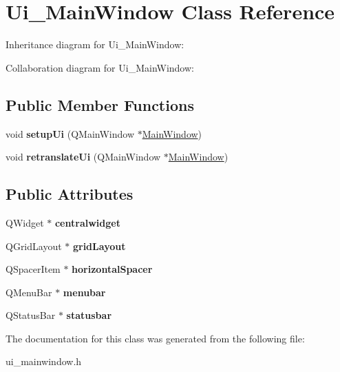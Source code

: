 \hypertarget{class_ui___main_window}{\section{Ui\-\_\-\-Main\-Window Class Reference}
\label{class_ui___main_window}
}


Inheritance diagram for Ui\-\_\-\-Main\-Window\-:


Collaboration diagram for Ui\-\_\-\-Main\-Window\-:
\subsection*{Public Member Functions}
\begin{DoxyCompactItemize}
\item 
\hypertarget{class_ui___main_window_acf4a0872c4c77d8f43a2ec66ed849b58}{void {\bfseries setup\-Ui} (Q\-Main\-Window $\ast$\hyperlink{class_main_window}{Main\-Window})}\label{class_ui___main_window_acf4a0872c4c77d8f43a2ec66ed849b58}

\item 
\hypertarget{class_ui___main_window_a097dd160c3534a204904cb374412c618}{void {\bfseries retranslate\-Ui} (Q\-Main\-Window $\ast$\hyperlink{class_main_window}{Main\-Window})}\label{class_ui___main_window_a097dd160c3534a204904cb374412c618}

\end{DoxyCompactItemize}
\subsection*{Public Attributes}
\begin{DoxyCompactItemize}
\item 
\hypertarget{class_ui___main_window_a356f1cf3ebda15f1fac59467ee081b74}{Q\-Widget $\ast$ {\bfseries centralwidget}}\label{class_ui___main_window_a356f1cf3ebda15f1fac59467ee081b74}

\item 
\hypertarget{class_ui___main_window_a525ed3c5fe0784ac502ee222fba4e205}{Q\-Grid\-Layout $\ast$ {\bfseries grid\-Layout}}\label{class_ui___main_window_a525ed3c5fe0784ac502ee222fba4e205}

\item 
\hypertarget{class_ui___main_window_a7871ea8c4b6c595d7ccd53960b344719}{Q\-Spacer\-Item $\ast$ {\bfseries horizontal\-Spacer}}\label{class_ui___main_window_a7871ea8c4b6c595d7ccd53960b344719}

\item 
\hypertarget{class_ui___main_window_adf43d9a67adaec750aaa956b5e082f09}{Q\-Menu\-Bar $\ast$ {\bfseries menubar}}\label{class_ui___main_window_adf43d9a67adaec750aaa956b5e082f09}

\item 
\hypertarget{class_ui___main_window_a1687cceb1e2787aa1f83e50433943a91}{Q\-Status\-Bar $\ast$ {\bfseries statusbar}}\label{class_ui___main_window_a1687cceb1e2787aa1f83e50433943a91}

\end{DoxyCompactItemize}


The documentation for this class was generated from the following file\-:\begin{DoxyCompactItemize}
\item 
ui\-\_\-mainwindow.\-h\end{DoxyCompactItemize}
